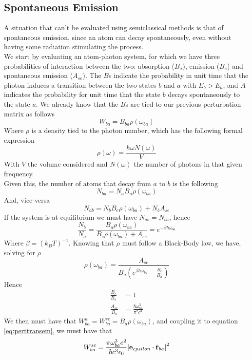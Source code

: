 \documentclass[../qm.tex]{subfiles}
\begin{document}
	\subsection{Spontaneous Emission}
	A situation that can't be evaluated using semiclassical methods is that of spontaneous emission, since an atom can decay spontaneously, even without having some radiation stimulating the process.\\
	We start by evaluating an atom-photon system, for which we have three probabilities of interaction between the two: absorption ($B_a$), emission ($B_e$) and spontaneous emission ($A_{se}$). The $B$s indicate the probability in unit time that the photon induces a transition between the two states $b$ and $a$ with $E_b>E_a$, and $A$ indicates the probability for unit time that the state $b$ decays spontaneously to the state $a$. We already know that the $B$s are tied to our previous perturbation matrix as follows
	\begin{equation*}
		W_{ba}=B_{ba}\rho(\omega_{ba})
	\end{equation*}
	Where $\rho$ is a density tied to the photon number, which has the following formal expression
	\begin{equation*}
		\rho(\omega)=\frac{\hbar\omega N(\omega)}{V}
	\end{equation*}
	With $V$ the volume considered and $N(\omega)$ the number of photons in that given frequency.\\
	Given this, the number of atoms that decay from $a$ to $b$ is the following
	\begin{equation*}
		N_{ba}=N_aB_a\rho(\omega_{ba})
	\end{equation*}
	And, vice-versa
	\begin{equation*}
		N_{ab}=N_bB_e\rho(\omega_{ba})+N_bA_{se}
	\end{equation*}
	If the system is at equilibrium we must have $N_{ab}=N_{ba}$, hence
	\begin{equation}
		\frac{N_b}{N_a}=\frac{B_a\rho(\omega_{ba})}{B_e\rho(\omega_{ba})+A_{se}}=e^{-\beta\hbar\omega_{ba}}
		\label{eq:equilibriumse}
	\end{equation}
	Where $\beta=(k_BT)^{-1}$. Knowing that $\rho$ must follow a Black-Body law, we have, solving for $\rho$
	\begin{equation}
		\rho(\omega_{ba})=\frac{A_{se}}{B_a\left( e^{\beta\hbar\omega_{ba}}-\frac{B_e}{B_a} \right)}
		\label{eq:transitiondensityse}
	\end{equation}
	Hence
	\begin{equation}
		\begin{aligned}
			\frac{B_e}{B_a}&=1\\
			\frac{A_{se}}{B_a}&=\frac{\hbar\omega_{ba}^3}{\pi^2c^3}
		\end{aligned}
		\label{eq:coefficients}
	\end{equation}
	We then must have that $W_{ba}^a=W_{ba}^{se}=B_a\rho(\omega_{ba})$, and coupling it to equation \eqref{eq:perttransem}, we must have that
	\begin{equation}
		W_{ba}^{se}=\frac{\pi\omega_{ba}^3e^2}{\hbar c^3\epsilon_0}\abs{\mathbf{e}_{epsilon}\cdot\hat{\mathbf{r}}_{ba}}^2
		\label{eq:spontaneousemissiontransmatrix}
	\end{equation}
\end{document}
